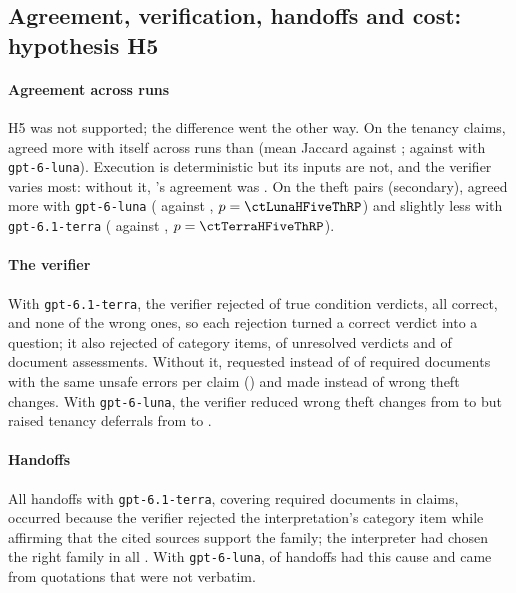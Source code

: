 \subsection{Agreement, verification, handoffs and cost: hypothesis H5}
\label{sec:results-cost}

\paragraph{Agreement across runs}
H5 was not supported; the difference went the other way. On the tenancy claims,  agreed more with itself across runs than \casepath (mean Jaccard \ctTerraHFiveB{} against \ctTerraHFiveA; \ctLunaHFiveB{} against \ctLunaHFiveA{} with \texttt{gpt-6-luna}). Execution is deterministic but its inputs are not, and the verifier varies most: without it, \casepath's agreement was \tenTerraCPxnRetest. On the theft pairs (secondary), \casepath agreed more with \texttt{gpt-6-luna} (\ctLunaHFiveThRA{} against \ctLunaHFiveThRB, $p=\ctLunaHFiveThRP$) and slightly less with \texttt{gpt-6.1-terra} (\ctTerraHFiveThRA{} against \ctTerraHFiveThRB, $p=\ctTerraHFiveThRP$).

\paragraph{The verifier}
With \texttt{gpt-6.1-terra}, the verifier rejected \verRejCondTrue{} of \verCheckedCondTrue{} true condition verdicts, all correct, and none of the \jaFlipped{} wrong ones, so each rejection turned a correct verdict into a question; it also rejected \verRejCategory{} of \verRuns{} category items, \verRejCondUnres{} of \verCheckedCondUnres{} unresolved verdicts and \verRejDocument{} of \verCheckedDocument{} document assessments. Without it, \casepath requested \pct{\tenTerraCPxnRecall} instead of \pct{\tenTerraCPxRecall} of required documents with the same unsafe errors per claim (\tenTerraCPxnUnsafe) and made \thTerraCPnWrong{} instead of \thTerraCPWrong{} wrong theft changes. With \texttt{gpt-6-luna}, the verifier reduced wrong theft changes from \thLunaCPnWrong{} to \thLunaCPWrong{} but raised tenancy deferrals from \pct{\tenLunaCPxnDefer} to \pct{\tenLunaCPxDefer}.

\paragraph{Handoffs}
All \hoTerraRuns{} handoffs with \texttt{gpt-6.1-terra}, covering \hoTerraDocs{} required documents in \hoTerraVerCatClaims{} claims, occurred because the verifier rejected the interpretation's category item while affirming that the cited sources support the family; the interpreter had chosen the right family in all \hoTerraFamilyRight. With \texttt{gpt-6-luna}, \hoLunaVerCatRuns{} of \hoLunaRuns{} handoffs had this cause and \hoLunaCiteRuns{} came from quotations that were not verbatim.

